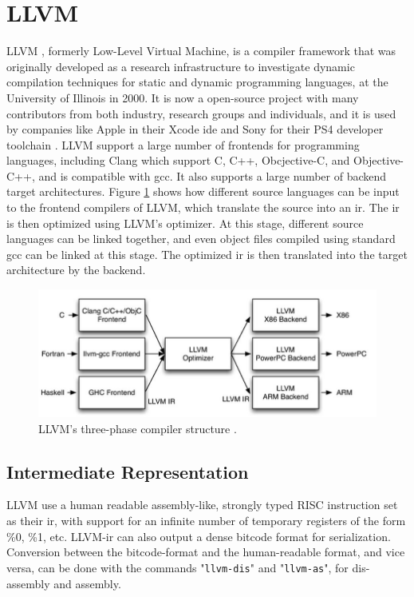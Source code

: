 \section{\label{sec:LLVM}LLVM}
LLVM \cite{LLVM:CGO04}, formerly Low-Level Virtual Machine, is a compiler framework that was originally developed as a research infrastructure to investigate dynamic compilation techniques for static and dynamic programming languages, at the University of Illinois in 2000. It is now a open-source project with many contributors from both industry, research groups and individuals, and it is used by companies like Apple in their Xcode \gls{ide} \cite{llvmapple} and Sony for their PS4 developer toolchain \cite{llvmsony}. LLVM support a large number of frontends for programming languages, including Clang \cite{clang} which support C, C++, Obcjective-C, and Objective-C++, and is compatible with \gls{gcc}. It also supports a large number of backend target architectures. Figure \ref{fig:llvmcompiler} shows how different source languages can be input to the frontend compilers of LLVM, which translate the source into an \gls{ir}. The \gls{ir} is then optimized using LLVM's optimizer. At this stage, different source languages can be linked together, and even object files compiled using standard \gls{gcc} can be linked at this stage. The optimized \gls{ir} is then translated into the target architecture by the backend.

\begin{figure}[hbpt]
\centering
\includegraphics[width=\textwidth]{../figs/LLVMCompiler.jpg}
\caption{\label{fig:llvmcompiler}LLVM's three-phase compiler structure \cite{llvmarch}.}
\end{figure}

\subsection{Intermediate Representation}
LLVM use a human readable assembly-like, strongly typed RISC instruction set as their \gls{ir}, with support for an infinite number of temporary registers of the form \%0, \%1, etc. LLVM-\gls{ir} can also output a dense bitcode format for serialization. Conversion between the bitcode-format and the human-readable format, and vice versa, can be done with the commands "\verb!llvm-dis!" and "\verb!llvm-as!", for dis-assembly and assembly.

